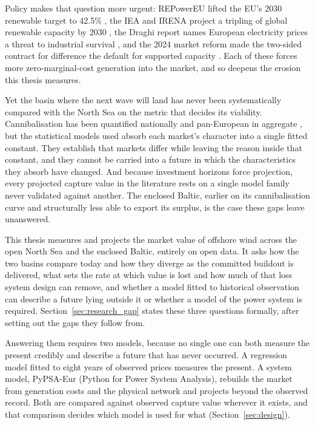Policy makes that question more urgent: REPowerEU lifted the EU's 2030 renewable
target to 42.5\% \cite{REPowerEU2022}, the IEA and IRENA project a tripling
of global renewable capacity by 2030 \cite{IEA2024, IRENA2024}, the Draghi
report names European electricity prices a threat to industrial survival
\cite{Draghi2024}, and the 2024 market reform made the two-sided contract for
difference the default for supported capacity \cite{EUMarketReform2024}.
Each of these forces more zero-marginal-cost generation into the market, and
so deepens the erosion this thesis measures.

Yet the basin where the next wave will land has never been systematically compared
with the North Sea on the metric that decides its viability. Cannibalisation has
been quantified nationally \cite{Hirth2013} and pan-European in aggregate
\cite{Stiewe2025}, but the statistical models used absorb each market's character
into a single fitted constant. They establish that markets differ while leaving
the reason inside that constant, and they cannot be carried into a future in
which the characteristics they absorb have changed. And because investment horizons force projection, every projected capture
value in the literature rests on a single model family never validated
against another. The enclosed Baltic, earlier on its cannibalisation curve
and structurally less able to export its surplus, is the case these gaps
leave unanswered.

This thesis measures and projects the market value of offshore wind across the
open North Sea and the enclosed Baltic, entirely on open data. It asks how the
two basins compare today and how they diverge as the committed buildout is
delivered, what sets the rate at which value is lost and how much of that loss
system design can remove, and whether a model fitted to historical observation
can describe a future lying outside it or whether a model of the power system is
required. Section~\ref{sec:research_gap} states these three questions formally,
after setting out the gaps they follow from.

Answering them requires two models, because no single one can both measure the
present credibly and describe a future that has never occurred. A regression
model fitted to eight years of observed prices measures the present. A system
model, PyPSA-Eur (Python for Power System Analysis), rebuilds the market from
generation costs and the physical network and projects beyond the observed
record. Both are compared against observed capture value wherever it exists, and
that comparison decides which model is used for what
(Section~\ref{sec:design}).

